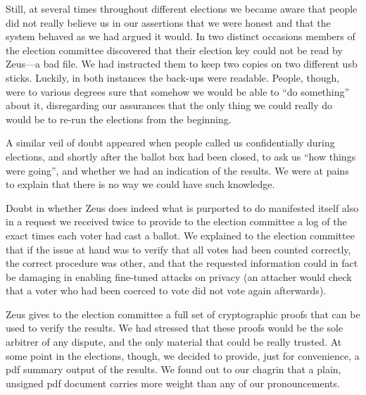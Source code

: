\documentclass[letterpaper,10pt]{article}
\begin{document}
Still, at several times throughout different elections we became aware
that people did not really believe us in our assertions that we were
honest and that the system behaved as we had argued it would. In two
distinct occasions members of the election committee discovered that
their election key could not be read by Zeus---a bad file. We had
instructed them to keep two copies on two different {\sc usb} sticks.
Luckily, in both instances the back-ups were readable. People, though,
were to various degrees sure that somehow we would be able to ``do
something'' about it, disregarding our assurances that the only thing
we could really do would be to re-run the elections from the beginning.

A similar veil of doubt appeared when people called us confidentially
during elections, and shortly after the ballot box had been closed, to
ask us ``how things were going'', and whether we had an indication of
the results. We were at pains to explain that there is no way we could
have such knowledge.

Doubt in whether Zeus does indeed what is purported to do manifested
itself also in a request we received twice to provide to the election
committee a log of the exact times each voter had cast a ballot. We
explained to the election committee that if the issue at hand was to
verify that all votes had been counted correctly, the correct
procedure was other, and that the requested information could in fact
be damaging in enabling fine-tuned attacks on privacy (an attacher
would check that a voter who had been coerced to vote did not vote
again afterwards). 

Zeus gives to the election committee a full set of cryptographic
proofs that can be used to verify the results. We had stressed that
these proofs would be the sole arbitrer of any dispute, and the only
material that could be really trusted. At some point in the elections,
though, we decided to provide, just for convenience, a {\sc pdf}
summary output of the results. We found out to our chagrin that a
plain, unsigned {\sc pdf} document carries more weight than any of our
pronouncements.
\end{document}
